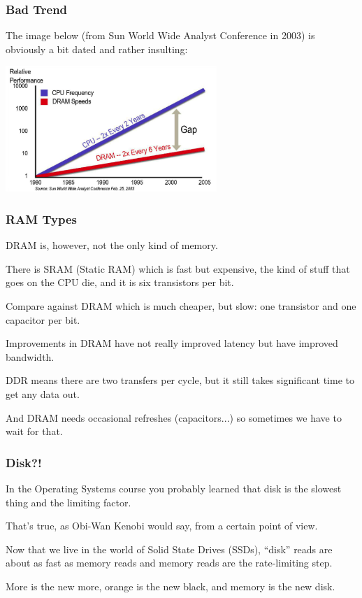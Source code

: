 \begin{frame}
\frametitle{Bad Trend}

The image below (from Sun World Wide Analyst Conference in 2003) is obviously a bit dated and rather insulting:
\begin{center}
\includegraphics[width=0.6\textwidth]{images/ram-vs-cpu.png}
\end{center}

\end{frame}



\begin{frame}
\frametitle{RAM Types}

DRAM is, however, not the only kind of memory. 

There is SRAM (Static RAM) which is fast but expensive, the kind of stuff that goes on the CPU die, and it is six transistors per bit. 

Compare against DRAM which is much cheaper, but slow: one transistor and one capacitor per bit. 

Improvements in DRAM have not really improved latency but have improved bandwidth. 

DDR means there are two transfers per cycle, but it still takes significant time to get any data out. 

And DRAM needs occasional refreshes (capacitors...) so sometimes we have to wait for that.

\end{frame}



\begin{frame}
\frametitle{Disk?!}

In the Operating Systems course you probably learned that disk is the slowest thing and the limiting factor. 

That's true, as Obi-Wan Kenobi would say, from a certain point of view. 

Now that we live in the world of Solid State Drives (SSDs), ``disk'' reads are about as fast as memory reads and memory reads are the rate-limiting step. 

More is the new more, orange is the new black, and memory is the new disk.

\end{frame}



